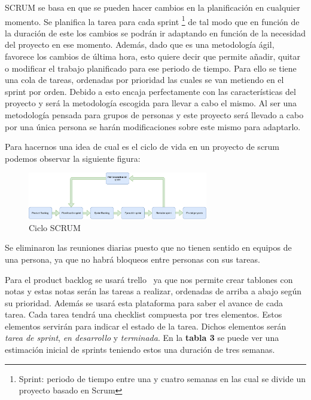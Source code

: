 \documentclass[11pt,a4paper,twoside,final]{article}
\begin{document}
\medskip
SCRUM se basa en que se pueden hacer cambios en la planificación en cualquier momento. Se planifica
 la tarea para cada sprint \footnote{Sprint: periodo de tiempo entre una y cuatro semanas en las cual
 se divide un proyecto basado en Scrum} de tal modo que en función de la duración de este los cambios
 se podrán ir adaptando en función de la necesidad del proyecto en ese momento. Además, dado que es una
 metodología ágil, favorece los cambios de última hora, esto quiere decir que permite añadir, quitar o
 modificar el trabajo planificado para ese periodo de tiempo. Para ello se tiene una cola de tareas,
 ordenadas por prioridad las cuales se van metiendo en el sprint por orden. Debido a esto encaja perfectamente
 con las características del proyecto y será la metodología escogida para llevar a cabo el mismo. Al
 ser una metodología pensada para grupos de personas y este proyecto será llevado a cabo por una única
 persona se harán modificaciones sobre este mismo para adaptarlo.

Para hacernos una idea de cual es el ciclo de vida en un proyecto de scrum podemos observar la siguiente figura:

\begin{figure}[H]
  \centering
   \includegraphics[width=0.7\textwidth]{Scrum.pdf}
  \caption{Ciclo SCRUM}
  \label{Ciclo SCRUM}
\end{figure}

Se eliminaron las reuniones diarias puesto que no tienen sentido en equipos de una persona,
 ya que no habrá bloqueos entre personas con sus tareas.

\bigskip

Para el product backlog se usará trello~\cite{trello} ya que nos permite crear tablones con
 notas y estas notas serán las tareas a realizar, ordenadas de arriba a abajo según su prioridad.
 Además se usará esta plataforma para saber el avance de cada tarea. Cada tarea tendrá una checklist
 compuesta por tres elementos. Estos elementos servirán para indicar el estado de la tarea. Dichos
 elementos serán \textit{tarea de sprint}, \textit{en desarrollo} y \textit{terminada}. En la \textbf{tabla 3}
 se puede ver una estimación inicial de sprints teniendo estos una duración de tres semanas.
\end{document}
